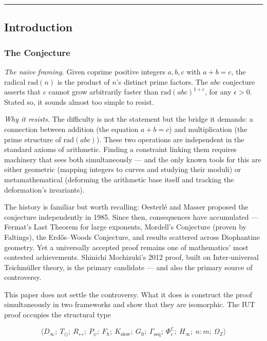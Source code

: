 \documentclass[12pt,a4paper]{article}
\begin{document}
\begin{center}
\rule{0.5\textwidth}{0.4pt}
\end{center}

\subsection{Introduction}

\subsubsection{The Conjecture}

\emph{The naive framing.} Given coprime positive integers $a, b, c$ with $a + b = c$, the radical $\text{rad}(n)$ is the product of $n$'s distinct prime factors. The $abc$ conjecture asserts that $c$ cannot grow arbitrarily faster than $\text{rad}(abc)^{1+\epsilon}$, for any $\epsilon > 0$. Stated so, it sounds almost too simple to resist.

\emph{Why it resists.} The difficulty is not the statement but the bridge it demands: a connection between addition (the equation $a + b = c$) and multiplication (the prime structure of $\text{rad}(abc)$). These two operations are independent in the standard axioms of arithmetic. Finding a constraint linking them requires machinery that sees both simultaneously --- and the only known tools for this are either geometric (mapping integers to curves and studying their moduli) or metamathematical (deforming the arithmetic base itself and tracking the deformation's invariants).

The history is familiar but worth recalling: Oesterlé and Masser proposed the conjecture independently in 1985. Since then, consequences have accumulated --- Fermat's Last Theorem for large exponents, Mordell's Conjecture (proven by Faltings), the Erdős--Woods Conjecture, and results scattered across Diophantine geometry. Yet a universally accepted proof remains one of mathematics' most contested achievements. Shinichi Mochizuki's 2012 proof, built on Inter-universal Teichmüller theory, is the primary candidate --- and also the primary source of controversy.

This paper does not settle the controversy. What it does is construct the proof simultaneously in two frameworks and show that they are isomorphic.
The IUT proof occupies the structural type

\[\langle D_{\infty};\ T_{\odot};\ R_{\leftrightarrow};\ P_{\psi};\ F_{\hbar};\ K_\text{slow};\ G_{\aleph};\ \Gamma_\text{seq};\ \Phi_c^\mathbb{C};\ H_{\infty};\ n{:}m;\ \Omega_\mathbb{Z} \rangle\]
\end{document}
